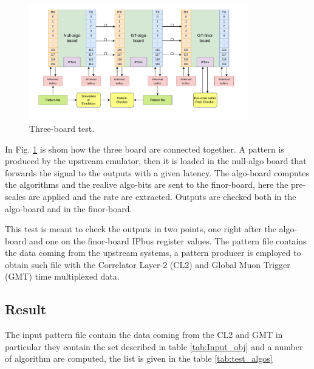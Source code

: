 \documentclass[../../main.tex]{subfiles}
\begin{document}
\begin{figure}[h]
    \centering
    \includegraphics[width=0.85\textwidth]{sections/06/Images/Board_test.pdf}
    \caption{Three-board test.}
    \label{fig:Three_board_test}
\end{figure}

In Fig. \ref{fig:Three_board_test} is shom how the three board are connected together. A pattern is produced by the upstream emulator, then it is loaded in the null-algo board that forwards the signal to the outputs with a given latency. The algo-board computes the algorithms and the realive algo-bits are sent to the finor-board, here the pre-scales are applied and the rate are extracted. Outputs are checked both in the algo-board and in the finor-board.

This test is meant to check the outputs in two points, one right after the algo-board and one on the finor-board IPbus register values.  
The pattern file contains the data coming from the upstream systems, a pattern producer is employed to obtain such file with the Correlator Layer-2 (CL2) and Global Muon Trigger (GMT) time multiplexed data.  


\subsection{Result}

The input pattern file contain the data coming from the CL2 and GMT in particular they contain the set described in table \ref{tab:Input_obj} and a number of algorithm are computed, the list is given in the table \ref{tab:test_algos}
\end{document}
